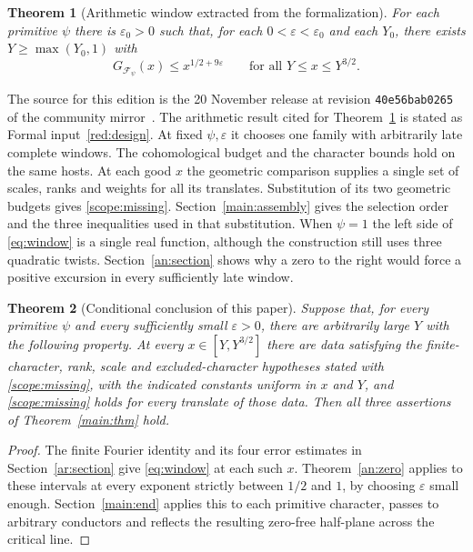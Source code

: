 \documentclass[11pt,a4paper]{article}
\newtheorem{theorem}{Theorem}[section]
\theoremstyle{definition}
\theoremstyle{remark}
\numberwithin{equation}{section}
\begin{document}
\begin{theorem}[Arithmetic window extracted from the formalization]\label{main:window}
For each primitive \(\psi\) there is \(\varepsilon_0>0\) such that, for each \(0<\varepsilon<\varepsilon_0\) and each \(Y_0\), there exists \(Y\ge\max(Y_0,1)\) with
\begin{equation}\label{eq:window}
  G_{\mathcal F_\psi}(x)\le x^{1/2+9\varepsilon}
  \qquad\text{for all }Y\le x\le Y^{3/2}.
\end{equation}
\end{theorem}
The source for this edition is the 20 November release at revision
\texttt{40e56bab0265} of the community mirror~\cite{source}.
The arithmetic result cited for Theorem~\ref{main:window} is stated
as Formal input~\ref{red:design}. At fixed \(\psi,\varepsilon\) it
chooses one family with arbitrarily late complete windows. The
cohomological budget and the character bounds hold on the same hosts.
At each good \(x\) the geometric comparison supplies a single set of
scales, ranks and weights for all its translates. Substitution of
its two geometric budgets gives \eqref{scope:missing}. Section~\ref{main:assembly}
gives the selection order and the three inequalities used in that
substitution. When \(\psi=1\) the left side of \eqref{eq:window} is a
single real function, although the construction still uses three
quadratic twists. Section~\ref{an:section} shows why a zero to the right
would force a positive excursion in every sufficiently late window.

\begin{theorem}[Conditional conclusion of this paper]\label{main:conditional}
Suppose that, for every primitive \(\psi\) and every sufficiently small
\(\varepsilon>0\), there are arbitrarily large \(Y\) with the following
property. At every \(x\in[Y,Y^{3/2}]\) there are data satisfying the
finite-character, rank, scale and excluded-character hypotheses stated
with \eqref{scope:missing}, with the indicated constants uniform in
\(x\) and \(Y\), and \eqref{scope:missing} holds for every
translate of those data. Then all three assertions of
Theorem~\ref{main:thm} hold.
\end{theorem}
\begin{proof}
The finite Fourier identity and its four error estimates in
Section~\ref{ar:section} give \eqref{eq:window} at each such \(x\).
Theorem~\ref{an:zero} applies to these intervals at every exponent
strictly between \(1/2\) and \(1\), by choosing \(\varepsilon\) small
enough. Section~\ref{main:end} applies this to each primitive character,
passes to arbitrary conductors and reflects the resulting zero-free
half-plane across the critical line.
\end{proof}
\end{document}

